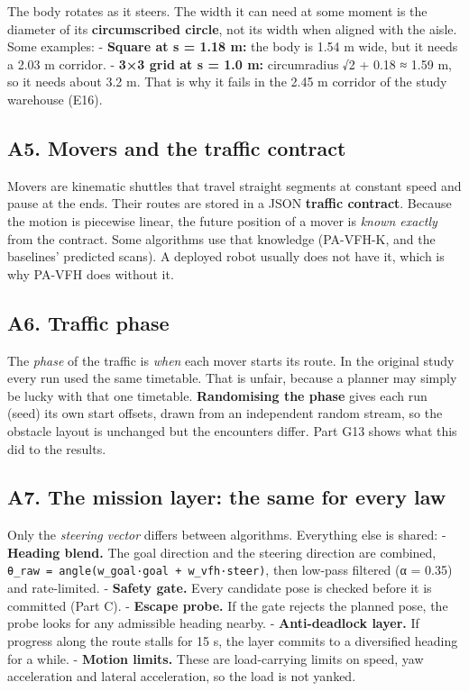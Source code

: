 \documentclass[
  10.5pt,
  a4paper,
]{article}
\begin{document}
The body rotates as it steers. The width it can need at some moment is
the diameter of its \textbf{circumscribed circle}, not its width when
aligned with the aisle. Some examples: - \textbf{Square at s = 1.18 m:}
the body is 1.54 m wide, but it needs a 2.03 m corridor. - \textbf{3×3
grid at s = 1.0 m:} circumradius √2 + 0.18 ≈ 1.59 m, so it needs about
3.2 m. That is why it fails in the 2.45 m corridor of the study
warehouse (E16).

\hypertarget{a5.-movers-and-the-traffic-contract}{%
\subsection{A5. Movers and the traffic
contract}\label{a5.-movers-and-the-traffic-contract}}

Movers are kinematic shuttles that travel straight segments at constant
speed and pause at the ends. Their routes are stored in a JSON
\textbf{traffic contract}. Because the motion is piecewise linear, the
future position of a mover is \emph{known exactly} from the contract.
Some algorithms use that knowledge (PA-VFH-K, and the baselines'
predicted scans). A deployed robot usually does not have it, which is
why PA-VFH does without it.

\hypertarget{a6.-traffic-phase}{%
\subsection{A6. Traffic phase}\label{a6.-traffic-phase}}

The \emph{phase} of the traffic is \emph{when} each mover starts its
route. In the original study every run used the same timetable. That is
unfair, because a planner may simply be lucky with that one timetable.
\textbf{Randomising the phase} gives each run (seed) its own start
offsets, drawn from an independent random stream, so the obstacle layout
is unchanged but the encounters differ. Part G13 shows what this did to
the results.

\hypertarget{a7.-the-mission-layer-the-same-for-every-law}{%
\subsection{A7. The mission layer: the same for every
law}\label{a7.-the-mission-layer-the-same-for-every-law}}

Only the \emph{steering vector} differs between algorithms. Everything
else is shared: - \textbf{Heading blend.} The goal direction and the
steering direction are combined,
\texttt{θ\_raw\ =\ angle(w\_goal·goal\ +\ w\_vfh·steer)}, then low-pass
filtered (α = 0.35) and rate-limited. - \textbf{Safety gate.} Every
candidate pose is checked before it is committed (Part C). -
\textbf{Escape probe.} If the gate rejects the planned pose, the probe
looks for any admissible heading nearby. - \textbf{Anti-deadlock layer.}
If progress along the route stalls for 15 s, the layer commits to a
diversified heading for a while. - \textbf{Motion limits.} These are
load-carrying limits on speed, yaw acceleration and lateral
acceleration, so the load is not yanked.
\end{document}
